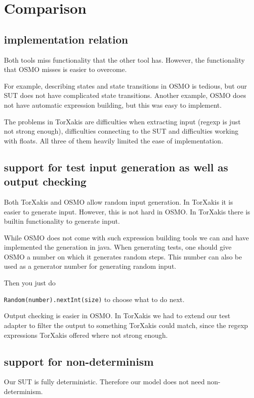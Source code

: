 \documentclass[11pt,a4paper]{article}
\begin{document}
\section{Comparison}
\subsection{implementation relation}
Both tools miss functionality that the other tool has. However, the functionality that OSMO misses is easier to overcome.

For example, describing states and state transitions in OSMO is tedious, but our SUT does not have complicated state transitions.
Another example, OSMO does not have automatic expression building, but this was easy to implement.

The problems in TorXakis are difficulties when extracting input (regexp is just not strong enough), difficulties connecting to the SUT and difficulties working with floats. All three of them heavily limited the ease of implementation.

\subsection{support for test input generation as well as output checking}

Both TorXakis and OSMO allow random input generation. In TorXakis it
is easier to generate input. However, this is not hard in OSMO. In
TorXakis there is builtin functionality to generate input.

While OSMO does not come with such expression building tools we can
and have implemented the generation in java. When generating tests,
one should give OSMO a number on which it generates random steps. This
number can also be used as a generator number for generating random
input.

Then you just do

\verb|Random(number).nextInt(size)| to choose what to do next.

Output checking is easier in OSMO. In TorXakis we had to extend our
test adapter to filter the output to something TorXakis could match,
since the regexp expressions TorXakis offered where not strong enough.

\subsection{support for non-determinism}
Our SUT is fully deterministic. Therefore our model does not need
non-determinism.
\end{document}
